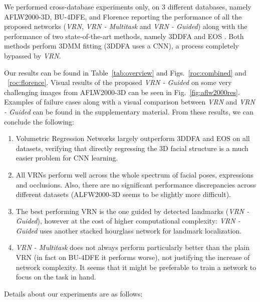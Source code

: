 We performed cross-database experiments only, on 3 different
databases, namely AFLW2000-3D, BU-4DFE, and Florence reporting the
performance of all the proposed networks (\textit{VRN}, \textit{VRN -
  Multitask} and \textit{VRN - Guided}) along with the performance of
two state-of-the-art methods, namely 3DDFA \cite{zhu2016face} and EOS
\cite{huber2016multiresolution}. Both methods perform 3DMM
fitting (3DDFA uses a CNN), a process completely bypassed by \textit{VRN}.


Our results can be found in Table~\ref{tab:overview} and
Figs.~\ref{roc:combined} and ~\ref{roc:florence}.
Visual results of the proposed \textit{VRN - Guided} on some very
challenging images from AFLW2000-3D can be seen in
Fig.~\ref{fig:aflw2000res}. Examples of failure cases along with a visual comparison between \textit{VRN} and \textit{VRN - Guided} can be found in the supplementary material. From these results, we can conclude the
following:
\begin{enumerate}
\item
Volumetric Regression Networks largely outperform 3DDFA and EOS on all datasets, verifying that directly regressing the 3D facial structure is a much easier problem for CNN learning.
\item
All VRNs perform well across the whole spectrum of facial poses, expressions and occlusions. Also, there are no significant performance discrepancies across different datasets (ALFW2000-3D seems to be slightly more difficult).
\item The best performing VRN is the one guided by detected landmarks
  (\textit{VRN - Guided}), however at the cost of higher computational
  complexity: \textit{VRN - Guided} uses another stacked hourglass network for
  landmark localization.
\item
\textit{VRN - Multitask} does not always perform particularly better than the plain VRN (in fact on BU-4DFE it performs worse), not justifying the increase of network complexity. It seems that it might be preferable to train a network to focus on the task in hand.
\end{enumerate}



\noindent{}Details about our experiments are as follows:

